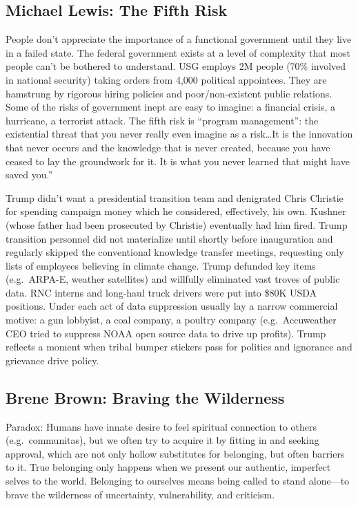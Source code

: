 \documentclass[
]{article}
\begin{document}
\hypertarget{michael-lewis-the-fifth-risk}{%
\subsection{Michael Lewis: The Fifth
Risk}\label{michael-lewis-the-fifth-risk}}

People don't appreciate the importance of a functional government until
they live in a failed state. The federal government exists at a level of
complexity that most people can't be bothered to understand. USG employs
2M people (70\% involved in national security) taking orders from 4,000
political appointees. They are hamstrung by rigorous hiring policies and
poor/non-existent public relations. Some of the risks of government
inept are easy to imagine: a financial crisis, a hurricane, a terrorist
attack. The fifth risk is ``program management'': the existential threat
that you never really even imagine as a risk\ldots It is the innovation
that never occurs and the knowledge that is never created, because you
have ceased to lay the groundwork for it. It is what you never learned
that might have saved you.''

Trump didn't want a presidential transition team and denigrated Chris
Christie for spending campaign money which he considered, effectively,
his own. Kushner (whose father had been prosecuted by Christie)
eventually had him fired. Trump transition personnel did not materialize
until shortly before inauguration and regularly skipped the conventional
knowledge transfer meetings, requesting only lists of employees
believing in climate change. Trump defunded key items (e.g.~ARPA-E,
weather satellites) and willfully eliminated vast troves of public data.
RNC interns and long-haul truck drivers were put into \$80K USDA
positions. Under each act of data suppression usually lay a narrow
commercial motive: a gun lobbyist, a coal company, a poultry company
(e.g.~Accuweather CEO tried to suppress NOAA open source data to drive
up profits). Trump reflects a moment when tribal bumper stickers pass
for politics and ignorance and grievance drive policy.

\hypertarget{brene-brown-braving-the-wilderness}{%
\subsection{Brene Brown: Braving the
Wilderness}\label{brene-brown-braving-the-wilderness}}

Paradox: Humans have innate desire to feel spiritual connection to
others (e.g.~communitas), but we often try to acquire it by fitting in
and seeking approval, which are not only hollow substitutes for
belonging, but often barriers to it. True belonging only happens when we
present our authentic, imperfect selves to the world. Belonging to
ourselves means being called to stand alone---to brave the wilderness of
uncertainty, vulnerability, and criticism.
\end{document}
